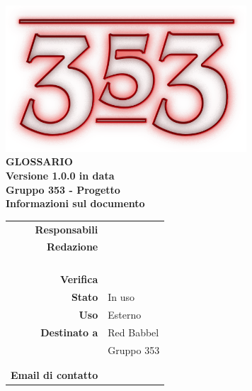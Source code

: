 \documentclass[openany, a4paper, 12pt]{report}
\begin{document}
\begin{titlepage}
\centering
\vfill
{
	\bfseries
	\vskip2cm
	\includegraphics[width=9cm]{../../common/images/logo.png} \\
	\vfill
	\Huge{GLOSSARIO}\\
	\vfill
	\Large Versione 1.0.0 in data \\
	\large Gruppo 353 - Progetto \progetto \\
	\vfill
	\normalsize Informazioni sul documento\\
	\begin{table}[htbp]
		\centering
		\renewcommand\arraystretch{1.2}
		\begin{tabular}{r|l}
			\hline
			\textbf{Responsabili}	& \Parwinder\\
			
			\textbf{Redazione} 		& \Valentina \\
									& \Riccardo \\
									& \Mirco \\
									& \Elena \\
									& \Gianluca \\
			\textbf{Verifica} 		& \Davide \\	
			
			\textbf{Stato} 			& In uso\\
			\textbf{Uso}			& Esterno\\
			\textbf{Destinato a}   	& Red Babbel\\
									& Gruppo 353\\
									& \Vardanega\\
									& \Cardin\\
			
			\textbf{Email di contatto}	& \mailgroup
		\end{tabular}
	\end{table}
	\vfill 
}      
\end{titlepage}

\printglossary
 
\end{document}
